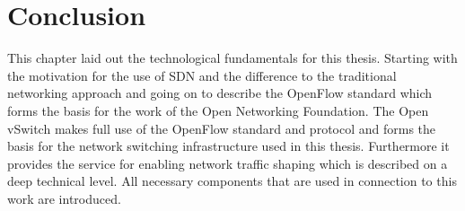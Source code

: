 \section{Conclusion}

This chapter laid out the technological fundamentals for this thesis. Starting with the motivation for the use of SDN and the difference to the traditional networking approach and going on to describe the OpenFlow standard which forms the basis for the work of the Open Networking Foundation. The Open vSwitch makes full use of the OpenFlow standard and protocol and forms the basis for the network switching infrastructure used in this thesis. Furthermore it provides the service for enabling network traffic shaping which is described on a deep technical level. All necessary components that are used in connection to this work are introduced.